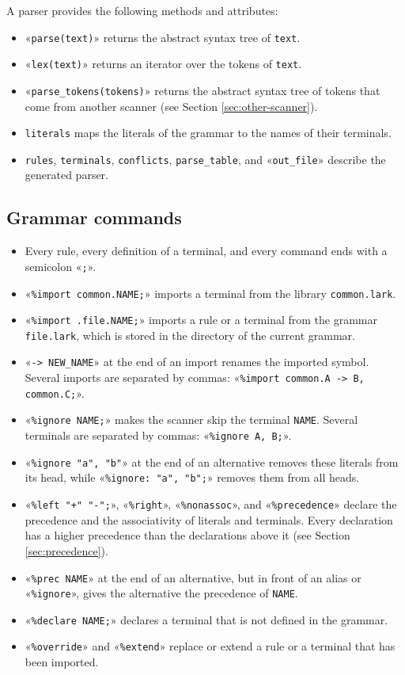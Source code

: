 \documentclass[11pt,a4paper]{article}
\begin{document}
A parser provides the following methods and attributes:
\begin{itemize}
\item «\verb|parse(text)|» returns the abstract syntax tree of \texttt{text}.
\item «\verb|lex(text)|» returns an iterator over the tokens of \texttt{text}.
\item «\verb|parse_tokens(tokens)|» returns the abstract syntax tree of tokens that come from another
      scanner (see Section \ref{sec:other-scanner}).
\item \texttt{literals} maps the literals of the grammar to the names of their terminals.
\item \texttt{rules}, \texttt{terminals}, \texttt{conflicts}, \texttt{parse\_table}, and
      «\verb|out_file|» describe the generated parser.
\end{itemize}

\subsection{Grammar commands}
\begin{itemize}
\item Every rule, every definition of a terminal, and every command ends with a semicolon «\verb|;|».
\item «\verb|%import common.NAME;|» imports a terminal from the library \texttt{common.lark}.
\item «\verb|%import .file.NAME;|» imports a rule or a terminal from the grammar \texttt{file.lark}, which is
      stored in the directory of the current grammar.
\item «\verb|-> NEW_NAME|» at the end of an import renames the imported symbol.  Several imports are separated
      by commas: «\verb|%import common.A -> B, common.C;|».
\item «\verb|%ignore NAME;|» makes the scanner skip the terminal \texttt{NAME}.  Several terminals are
      separated by commas: «\verb|%ignore A, B;|».
\item «\verb|%ignore "a", "b"|» at the end of an alternative removes these literals from its head, while
      «\verb|%ignore: "a", "b";|» removes them from all heads.
\item «\verb|%left "+" "-";|», «\verb|%right|», «\verb|%nonassoc|», and «\verb|%precedence|» declare the
      precedence and the associativity of literals and terminals.  Every declaration has a higher precedence
      than the declarations above it (see Section \ref{sec:precedence}).
\item «\verb|%prec NAME|» at the end of an alternative, but in front of an alias or «\verb|%ignore|», gives
      the alternative the precedence of \texttt{NAME}.
\item «\verb|%declare NAME;|» declares a terminal that is not defined in the grammar.
\item «\verb|%override|» and «\verb|%extend|» replace or extend a rule or a terminal that has been imported.
\end{itemize}
\end{document}
